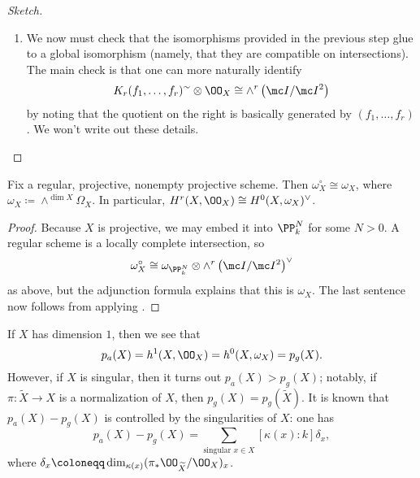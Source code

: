 \documentclass[../notes.tex]{subfiles}
\begin{document}
\begin{proof}[Sketch]
\begin{enumerate}
		\item We now must check that the isomorphisms provided in the previous step glue to a global isomorphism (namely, that they are compatible on intersections). The main check is that one can more naturally identify
		\[K_r(f_1,\ldots,f_r)^{\sim}\otimes\OO_X\cong\land^r\left(\mc I/\mc I^2\right)\]
		by noting that the quotient on the right is basically generated by $(f_1,\ldots,f_r)$. We won't write out these details.
		\qedhere
	\end{enumerate}
\end{proof}
\begin{corollary}
	Fix a regular, projective, nonempty projective scheme. Then $\omega_X^\circ\cong\omega_X$, where $\omega_X\coloneqq\land^{\dim X}\Omega_X$.
	In particular, $H^r(X,\OO_X)\cong H^0(X,\omega_X)^\lor$.
\end{corollary}
\begin{proof}
	Because $X$ is projective, we may embed it into $\PP^N_k$ for some $N>0$. A regular scheme is a locally complete intersection, so
	\[\omega_X^\circ\cong\omega_{\PP^N_k}\otimes\land^r\left(\mc I/\mc I^2\right)^\lor\]
	as above, but the adjunction formula \cite[Proposition~II.8.20]{hartshorne} explains that this is $\omega_X$. The last sentence now follows from applying .
\end{proof}
\begin{example}
	If $X$ has dimension $1$, then we see that
	\[p_a(X)=h^1(X,\OO_X)=h^0(X,\omega_X)=p_g(X).\]
	However, if $X$ is singular, then it turns out $p_a(X)>p_g(X)$; notably, if $\pi\colon\widetilde X\to X$ is a normalization of $X$, then $p_g(X)=p_g(\widetilde X)$. It is known that $p_a(X)-p_g(X)$ is controlled by the singularities of $X$: one has
	\[p_a(X)-p_g(X)=\sum_{\text{singular }x\in X}[\kappa(x):k]\delta_x,\]
	where $\delta_x\coloneqq\dim_{\kappa(x)}(\pi_*\OO_{\widetilde X}/\OO_{X})_x$.
\end{example}
\end{document}
